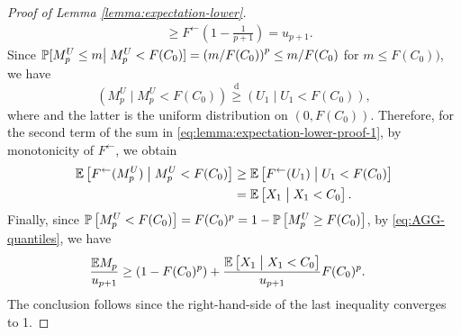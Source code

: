 \begin{proof}[Proof of Lemma \ref{lemma:expectation-lower}]
\begin{align*}
        &\ge F^{\leftarrow}\left(1-\frac{1}{p+1}\right) = u_{p+1}.
\end{align*}
Since $\P[M^{U}_p\le m\big|\;M^{U}_p < F(C_0)] = \left(m/F(C_0)\right)^p \le m/F(C_0)$ for $m\le F(C_0))$, we have
$$\left(M^{U}_p\;\big|\;M^{U}_p < F(C_0)\right)\stackrel{\text{d}}{\ge} \left(U_1\;\big|\;U_1 < F(C_0)\right),$$
where and the latter is the uniform distribution on $(0,F(C_0))$.
Therefore, for the second term of the sum in \eqref{eq:lemma:expectation-lower-proof-1}, by monotonicity of $F^{\leftarrow}$, we obtain
\begin{align*}
    \E\left[F^{\leftarrow}(M^{U}_p)\;\big|\;M^{U}_p < F(C_0)\right] 
        &\ge \E\left[F^{\leftarrow}(U_1)\;\big|\;U_1 < F(C_0)\right] \\
        &= \E\left[X_1\;\big|\;X_1 < C_0\right].
\end{align*}
Finally, since $\P\left[M^{U}_p < F(C_0)\right] = F(C_0)^p = 1 - \P\left[M^{U}_p \ge F(C_0)\right]$, by \eqref{eq:AGG-quantiles}, we have
\begin{align*}
    \frac{\E M_p}{u_{p+1}} 
        &\ge \left(1 - F(C_0)^p\right) + \frac{\E\left[X_1\;\big|\;X_1 < C_0\right]}{u_{p+1}} F(C_0)^p.
\end{align*}
The conclusion follows since the right-hand-side of the last inequality converges to 1.
\end{proof}
